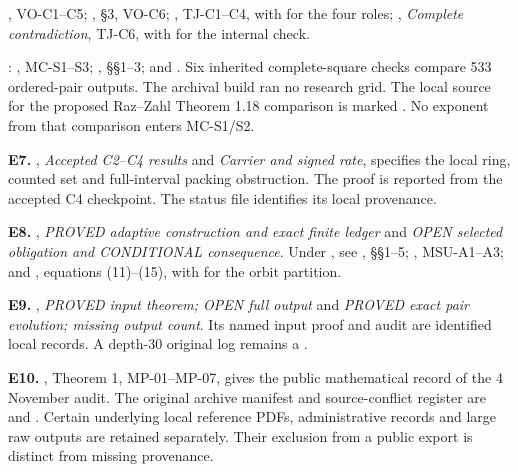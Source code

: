 , VO-C1--C5; , \S3, VO-C6; , TJ-C1--C4, with  for the four roles; , \emph{Complete contradiction}, TJ-C6, with  for the internal check.

: , MC-S1--S3; , \S\S1--3;  and . Six inherited complete-square checks compare 533 ordered-pair outputs. The archival build ran no research grid. The local source for the proposed Raz--Zahl Theorem 1.18 comparison is marked . No exponent from that comparison enters MC-S1/S2. \cite{scales}

\textbf{E7.} , \emph{Accepted C2--C4 results} and \emph{Carrier and signed rate}, specifies the local ring, counted set and full-interval packing obstruction. The proof is reported from the accepted C4 checkpoint. The status file identifies its local provenance.

\textbf{E8.} , \emph{PROVED adaptive construction and exact finite ledger} and \emph{OPEN selected obligation and CONDITIONAL consequence}. Under , see , \S\S1--5; , MSU-A1--A3; and , equations (11)--(15), with  for the orbit partition.

\textbf{E9.} , \emph{PROVED input theorem; OPEN full output} and \emph{PROVED exact pair evolution; missing output count}. Its named input proof and audit are identified local records. A depth-30 original log remains a .

\textbf{E10.} , Theorem 1, MP-01--MP-07, gives the public mathematical record of the 4 November audit. The original archive manifest and source-conflict register are  and . Certain underlying local reference PDFs, administrative records and large raw outputs are retained separately. Their exclusion from a public export is distinct from missing provenance.


